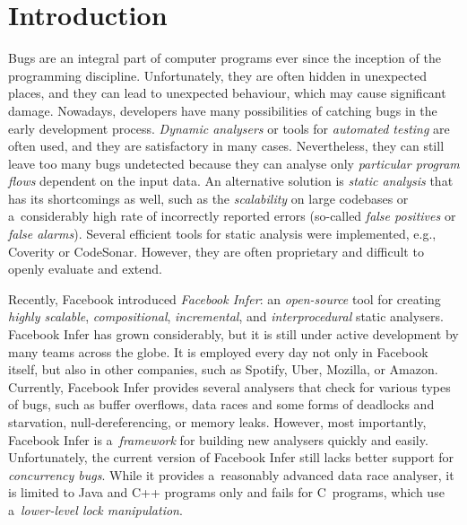 \documentclass{ExcelAtFIT}
\affiliation{%
    *\href{mailto:xharmi00@stud.fit.vutbr.cz}{xharmi00@stud.fit.vutbr.cz},
    \textit{Faculty of Information Technology, Brno University of Technology}%
}
\theoremstyle{definition}
\begin{document}
\setlength{\abovedisplayskip}{.3em}
\setlength{\belowdisplayskip}{.3em}


\startdocument




\section{Introduction}

Bugs are an integral part of computer programs ever since the inception of the programming discipline. Unfortunately, they are often hidden in unexpected places, and they can lead to unexpected behaviour, which may cause significant damage. Nowadays, developers have many possibilities of catching bugs in the early development process. \emph{Dynamic analysers} or tools for \emph{automated testing} are often used, and they are satisfactory in many cases. Nevertheless, they can still leave too many bugs undetected because they can analyse only \emph{particular program flows} dependent on the input data. An alternative solution is \emph{static analysis} that has its shortcomings as well, such as the \emph{scalability} on large codebases or a~considerably high rate of incorrectly reported errors (so-called \emph{false positives} or \emph{false alarms}). Several efficient tools for static analysis were implemented, e.g., Coverity or CodeSonar. However, they are often proprietary and difficult to openly evaluate and extend.

Recently, Facebook introduced \emph{Facebook Infer}: an \emph{open-source} tool for creating \emph{highly scalable}, \emph{compositional}, \emph{incremental}, and \emph{interprocedural} static analysers. Facebook Infer has grown considerably, but it is still under active development by many teams across the globe. It is employed every day not only in Facebook itself, but also in other companies, such as Spotify, Uber, Mozilla, or Amazon. Currently, Facebook Infer provides several analysers that check for various types of bugs, such as buffer overflows, data races and some forms of deadlocks and starvation, null-dereferencing, or memory leaks. However, most importantly, Facebook Infer is a~\emph{framework} for building new analysers quickly and easily. Unfortunately, the current version of Facebook Infer still lacks better support for \emph{concurrency bugs}. While it provides a~reasonably advanced data race analyser, it is limited to Java and C++ programs only and fails for C~programs, which use a~\emph{lower-level lock manipulation}.
\end{document}
